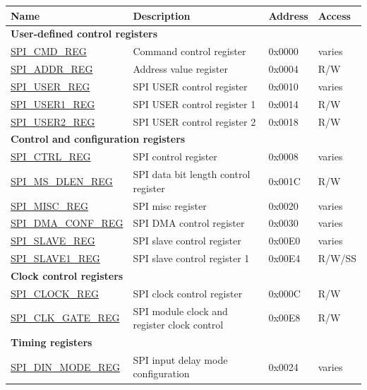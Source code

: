 \begin{longtable}{ | p{5.0cm} | p{7.2cm} | p{1.3cm} | p{2.0cm} | }
\hline\rowcolor{lightgray}
\textbf{Name} & \textbf{Description} &  \textbf{Address} & \textbf{Access} \\ \hline
\endhead
\multicolumn{4}{|l|}{\textbf{User-defined control registers}} \\ \hline
\hyperref[regdesc:SPICMDREG]{SPI\_CMD\_REG} & Command control register & 0x0000 & varies \\ \hline
\hyperref[regdesc:SPIADDRREG]{SPI\_ADDR\_REG} & Address value register & 0x0004 & R/W \\ \hline
\hyperref[regdesc:SPIUSERREG]{SPI\_USER\_REG} & SPI USER control register & 0x0010 & varies \\ \hline
\hyperref[regdesc:SPIUSER1REG]{SPI\_USER1\_REG} & SPI USER control register 1 & 0x0014 & R/W \\ \hline
\hyperref[regdesc:SPIUSER2REG]{SPI\_USER2\_REG} & SPI USER control register 2 & 0x0018 & R/W \\ \hline
\multicolumn{4}{|l|}{\textbf{Control and configuration registers}} \\ \hline
\hyperref[regdesc:SPICTRLREG]{SPI\_CTRL\_REG} & SPI control register & 0x0008 & varies \\ \hline
\hyperref[regdesc:SPIMSDLENREG]{SPI\_MS\_DLEN\_REG} & SPI data bit length control register & 0x001C & R/W \\ \hline
\hyperref[regdesc:SPIMISCREG]{SPI\_MISC\_REG} & SPI misc register & 0x0020 & varies \\ \hline
\hyperref[regdesc:SPIDMACONFREG]{SPI\_DMA\_CONF\_REG} & SPI DMA control register & 0x0030 & varies \\ \hline
\hyperref[regdesc:SPISLAVEREG]{SPI\_SLAVE\_REG} & SPI slave control register & 0x00E0 & varies \\ \hline
\hyperref[regdesc:SPISLAVE1REG]{SPI\_SLAVE1\_REG} & SPI slave control register 1 & 0x00E4 & R/W/SS \\ \hline
\multicolumn{4}{|l|}{\textbf{Clock control registers}} \\ \hline
\hyperref[regdesc:SPICLOCKREG]{SPI\_CLOCK\_REG} & SPI clock control register & 0x000C & R/W \\ \hline
\hyperref[regdesc:SPICLKGATEREG]{SPI\_CLK\_GATE\_REG} & SPI module clock and register clock control & 0x00E8 & R/W \\ \hline
\multicolumn{4}{|l|}{\textbf{Timing registers}} \\ \hline
\hyperref[regdesc:SPIDINMODEREG]{SPI\_DIN\_MODE\_REG} & SPI input delay mode configuration & 0x0024 & varies \\ \hline

\end{longtable}
